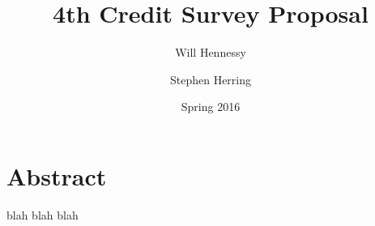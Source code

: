 \documentclass[12pt]{article}
\title{4th Credit Survey Proposal}
\author{Will Hennessy \and Stephen Herring}
\date{Spring 2016}
\begin{document}
\maketitle

\section*{Abstract}
blah blah blah



\end{document}
